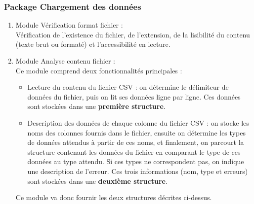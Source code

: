 			\subsubsection*{Package Chargement des données}
			\begin{enumerate}[leftmargin=*]
				\item Module Vérification format fichier :\\
				Vérification de l'existence du fichier, de l'extension, de la lisibilité du contenu (texte brut ou formaté) et l'accessibilité en lecture.
				\item Module Analyse contenu fichier :\\
				Ce module comprend deux fonctionnalités principales :
				\begin{itemize}[leftmargin=0.2cm]
					\item Lecture du contenu du fichier CSV : on détermine le délimiteur de données du fichier, puis on lit ses données ligne par ligne. Ces données sont stockées dans une \textbf{première structure}.
					\item Description des données de chaque colonne du fichier CSV : on stocke les noms des colonnes fournis dans le fichier, ensuite on détermine les types de données attendus à partir de ces noms, et finalement, on parcourt la structure contenant les données du fichier en comparant le type de ces données au type attendu. Si ces types ne correspondent pas, on indique une description de l'erreur. Ces trois informations (nom, type et erreurs) sont stockées dans une \textbf{deuxième structure}.
				\end{itemize}
				Ce module va donc fournir les deux structures décrites ci-dessus.
			\end{enumerate}
			
